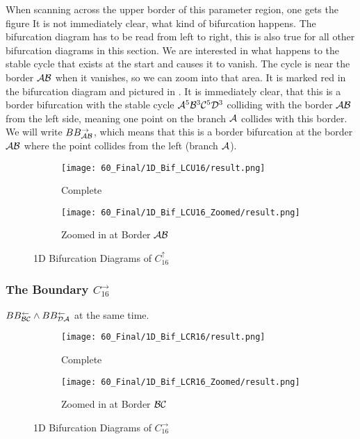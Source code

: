 When scanning across the upper border of this parameter region, one gets the figure 
It is not immediately clear, what kind of bifurcation happens.
The bifurcation diagram has to be read from left to right, this is also true for all other bifurcation diagrams in this section.
We are interested in what happens to the stable cycle that exists at the start and causes it to vanish.
The cycle is near the border $\mathcal{A}\mathcal{B}$ when it vanishes, so we can zoom into that area.
It is marked red in the bifurcation diagram and pictured in .
It is immediately clear, that this is a border bifurcation with the stable cycle $\mathcal{A}^5\mathcal{B}^3\mathcal{C}^5\mathcal{D}^3$ colliding with the border $\mathcal{A}\mathcal{B}$ from the left side, meaning one point on the branch $\mathcal{A}$ collides with this border.
We will write $BB_{\mathcal{A}\mathcal{B}}^{\rightarrow}$, which means that this is a border bifurcation at the border $\mathcal{A}\mathcal{B}$ where the point collides from the left (branch $\mathcal{A}$).


\begin{figure}
    \centering
    \begin{subfigure}{0.4\textwidth}
        \centering
        \texttt{[image: 60\_Final/1D\_Bif\_LCU16/result.png]}
        \caption{Complete}
        \label{fig:final.bifurcation.C.up}
    \end{subfigure}
    \begin{subfigure}{0.4\textwidth}
        \centering
        \texttt{[image: 60\_Final/1D\_Bif\_LCU16\_Zoomed/result.png]}
        \caption{Zoomed in at Border $\mathcal{A}\mathcal{B}$}
        \label{fig:bifurcation.C.up.zoomed}
    \end{subfigure}
    \caption{1D Bifurcation Diagrams of $C_{16}^\uparrow$}
\end{figure}

\subsubsection{The Boundary $C_{16}^\rightarrow$}

$BB_{\mathcal{B}\mathcal{C}}^\leftarrow \land BB_{\mathcal{D}\mathcal{A}}^\leftarrow$ at the same time.

\begin{figure}
    \centering
    \begin{subfigure}{0.4\textwidth}
        \centering
        \texttt{[image: 60\_Final/1D\_Bif\_LCR16/result.png]}
        \caption{Complete}
        \label{fig:final.bifurcation.C.right}
    \end{subfigure}
    \begin{subfigure}{0.4\textwidth}
        \centering
        \texttt{[image: 60\_Final/1D\_Bif\_LCR16\_Zoomed/result.png]}
        \caption{Zoomed in at Border $\mathcal{B}\mathcal{C}$}
        \label{fig:final.bifurcation.C.right.zoomed}
    \end{subfigure}
    \caption{1D Bifurcation Diagrams of $C_{16}^\rightarrow$}
\end{figure}

